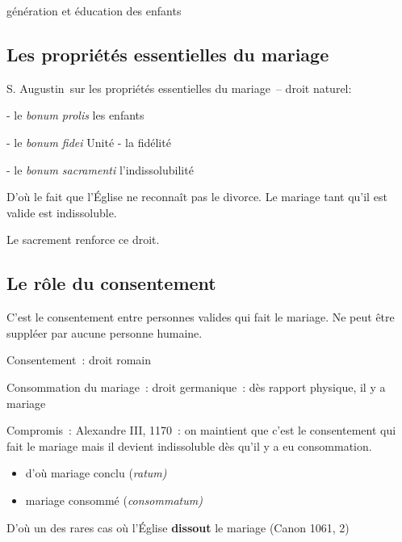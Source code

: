 génération et éducation des enfants

\hypertarget{les-propriuxe9tuxe9s-essentielles-du-mariage}{%
\subsection{Les propriétés essentielles du
mariage}\label{les-propriuxe9tuxe9s-essentielles-du-mariage}}

S. Augustin~sur les propriétés essentielles du mariage~-- droit
naturel:

- le \emph{bonum prolis} les enfants

- le \emph{bonum fidei} Unité - la fidélité

- le \emph{bonum sacramenti} l'indissolubilité

D'où le fait que l'Église ne reconnaît pas le divorce. Le mariage tant
qu'il est valide est indissoluble.

Le sacrement renforce ce droit.

\hypertarget{le-ruxf4le-du-consentement}{%
\subsection{Le rôle du
consentement}\label{le-ruxf4le-du-consentement}}

C'est le consentement entre personnes valides qui fait le mariage. Ne
peut être suppléer par aucune personne humaine.

Consentement~: droit romain

Consommation du mariage~: droit germanique~: dès rapport physique, il y
a mariage

Compromis~: Alexandre III, 1170~: on maintient que c'est le consentement
qui fait le mariage mais il devient indissoluble dès qu'il y a eu
consommation.

\begin{itemize}
\item
  d'où mariage conclu (\emph{ratum)}
\item
  mariage consommé (\emph{consommatum)}
\end{itemize}

D'où un des rares cas où l'Église \textbf{dissout} le mariage (Canon
1061, 2)

